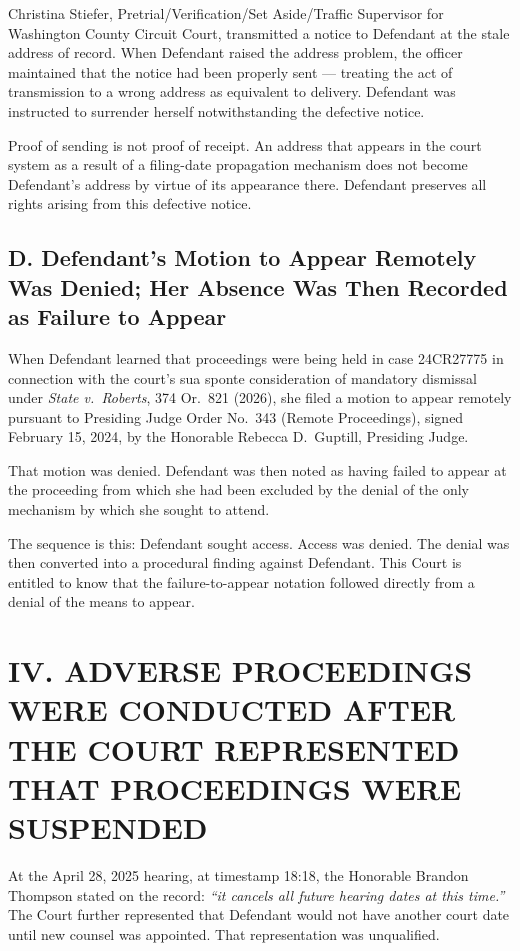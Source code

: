 \documentclass[12pt,letterpaper]{article}
\begin{document}
Christina Stiefer, Pretrial/Verification/Set Aside/Traffic Supervisor for
Washington County Circuit Court, transmitted a notice to Defendant at the stale
address of record. When Defendant raised the address problem, the officer
maintained that the notice had been properly sent --- treating the act of
transmission to a wrong address as equivalent to delivery. Defendant was
instructed to surrender herself notwithstanding the defective notice.

Proof of sending is not proof of receipt. An address that appears in the court
system as a result of a filing-date propagation mechanism does not become
Defendant's address by virtue of its appearance there. Defendant preserves all
rights arising from this defective notice.

\subsection*{D. Defendant's Motion to Appear Remotely Was Denied; Her Absence
Was Then Recorded as Failure to Appear}

When Defendant learned that proceedings were being held in case 24CR27775 in
connection with the court's sua sponte consideration of mandatory dismissal under
\textit{State v.\ Roberts}, 374 Or.\ 821 (2026), she filed a motion to appear
remotely pursuant to Presiding Judge Order No.\ 343 (Remote Proceedings), signed
February 15, 2024, by the Honorable Rebecca D.\ Guptill, Presiding Judge.

That motion was denied. Defendant was then noted as having failed to appear at
the proceeding from which she had been excluded by the denial of the only
mechanism by which she sought to attend.

The sequence is this: Defendant sought access. Access was denied. The denial was
then converted into a procedural finding against Defendant. This Court is entitled
to know that the failure-to-appear notation followed directly from a denial of
the means to appear.


\section*{IV. ADVERSE PROCEEDINGS WERE CONDUCTED AFTER THE COURT
REPRESENTED THAT PROCEEDINGS WERE SUSPENDED}

At the April 28, 2025 hearing, at timestamp 18:18, the Honorable Brandon Thompson
stated on the record: \textit{``it cancels all future hearing dates at this
time.''} The Court further represented that Defendant would not have another court
date until new counsel was appointed. That representation was unqualified.
\end{document}
